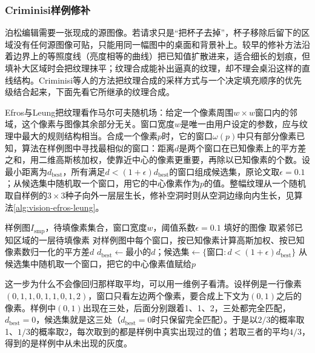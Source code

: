 \subsubsection{Criminisi样例修补}
\label{sec:vision-generation-exemplar-inpainting}

泊松编辑需要一张现成的源图像。若请求只是“把杯子去掉”，杯子移除后留下的区域没有任何源图像可贴，只能用同一幅图中的桌面和背景补上。较早的修补方法沿着边界上的等照度线（亮度相等的曲线）把已知值扩散进来，适合细长的划痕，但填补大区域时会把纹理抹平；纹理合成能补出逼真的纹理，却不理会桌沿这样的直线结构。Criminisi等人的方法把纹理合成的采样方式与一个决定填充顺序的优先级结合起来，下面先看它所继承的纹理合成。

Efros与Leung把纹理看作马尔可夫随机场：给定一个像素周围$w\times w$窗口内的邻域，这个像素与图像其余部分无关。窗口宽度$w$是唯一由用户设定的参数，应与纹理中最大的规则结构相当。合成一个像素$p$时，它的窗口$\omega(p)$中只有部分像素已知，算法在样例图中寻找最相似的窗口：距离$d$是两个窗口在已知像素上的平方差之和，用二维高斯核加权，使靠近中心的像素更重要，再除以已知像素的个数。设最小距离为$d_{\mathrm{best}}$，所有满足$d<(1+\epsilon)d_{\mathrm{best}}$的窗口组成候选集，原论文取$\epsilon=0.1$；从候选集中随机取一个窗口，用它的中心像素作为$p$的值。整幅纹理从一个随机取自样例的$3\times3$种子向外一层层生长，修补空洞时则从空洞边缘向内生长，见算法\ref{alg:vision-efros-leung}。

\begin{algorithm}
 \label{alg:vision-efros-leung}
 \begin{algorithmic}[1]
  \Require 样例图$I_{\mathrm{smp}}$，待填像素集合，窗口宽度$w$，阈值系数$\epsilon=0.1$
  \Ensure 填好的图像
   \State 取紧邻已知区域的一层待填像素
    \State 对样例图中每个窗口，按已知像素计算高斯加权、按已知像素数归一化的平方差$d$
    \State $d_{\mathrm{best}}\gets$最小的$d$；候选集$\gets\{$窗口$:d<(1+\epsilon)d_{\mathrm{best}}\}$
    \State 从候选集中随机取一个窗口，把它的中心像素值赋给$p$
   \EndFor
  \EndWhile
 \end{algorithmic}
\end{algorithm}

这一步为什么不会像回归那样取平均，可以用一维例子看清。设样例是一行像素$(0,1,1,0,1,1,0,1,2)$，窗口只看左边两个像素，要合成上下文为$(0,1)$之后的像素。样例中$(0,1)$出现在三处，后面分别跟着1、1、2，三处都完全匹配，$d_{\mathrm{best}}=0$，候选集就是这三处（$d_{\mathrm{best}}=0$时只保留完全匹配）。于是以$2/3$的概率取1、$1/3$的概率取2，每次取到的都是样例中真实出现过的值；若取三者的平均$4/3$，得到的是样例中从未出现的灰度。

